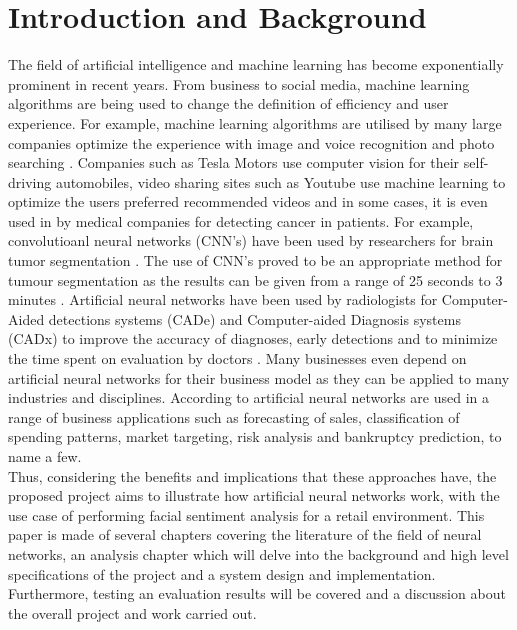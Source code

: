 

\chapter{Introduction and Background} 
The field of artificial intelligence and machine learning has become exponentially prominent in recent years.
From business to social media, machine learning algorithms are being used to change the definition of efficiency and user experience.
For example, machine learning algorithms are utilised by many large companies optimize the experience with image and voice recognition and photo searching \citep{adit}. Companies such as Tesla Motors use computer vision for their self-driving automobiles, video sharing sites such as Youtube use machine learning to optimize the users preferred recommended videos and in some cases, it is even used in by medical companies for detecting cancer in patients. For example, convolutioanl neural networks (CNN's) have been used by researchers for brain tumor segmentation \citep{DBLP}. The use of CNN's proved to be an appropriate method for tumour segmentation as the results can be given from a range of 25 seconds to 3 minutes \citep{DBLP}. Artificial neural networks have been used by radiologists for Computer-Aided detections systems (CADe) and Computer-aided Diagnosis systems (CADx) to improve the accuracy of diagnoses, early detections and to minimize the time spent on evaluation by doctors \citep{CADe}. Many businesses even depend on artificial neural networks for their business model as they can be applied to many industries and disciplines. According to \citet{geocities}
artificial neural networks are used in a range of business applications such as forecasting of sales, classification of spending patterns, market targeting, risk analysis and bankruptcy prediction, to name a few. \\
Thus, considering the benefits and implications that these approaches have, the proposed project aims to illustrate how artificial neural networks work, with the use case of performing facial sentiment analysis for a retail environment. This paper is made of several chapters covering the literature of the field of neural networks, an analysis chapter which will delve into the background and high level specifications of the project and a system design and implementation. Furthermore, testing an evaluation results will be covered and a discussion about the overall project and work carried out.